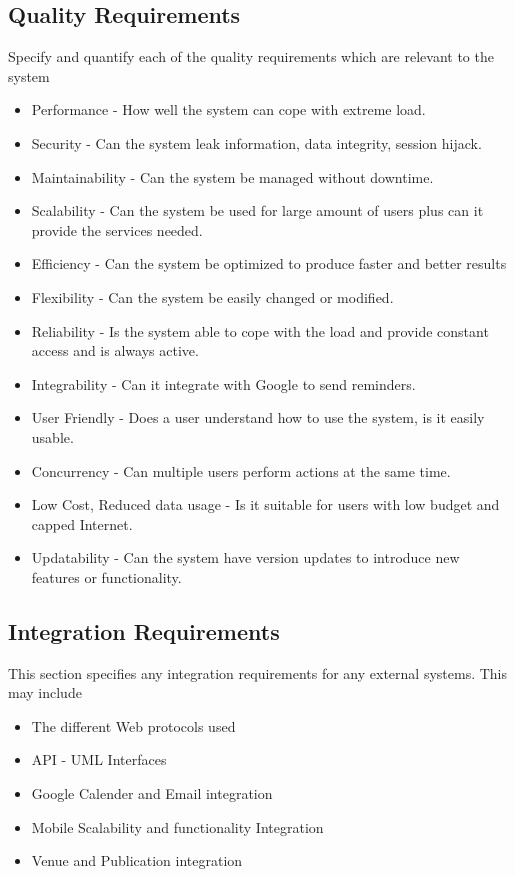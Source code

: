 \documentclass[a4paper]{article}
\begin{document}
	\subsection{Quality Requirements}
	Specify and quantify each of the quality requirements which are relevant to the system
	\begin{itemize}
		\item Performance - How well the system can cope with extreme load.
		\item Security - Can the system leak information, data integrity, session hijack.
		\item Maintainability - Can the system be managed without downtime.
		\item Scalability - Can the system be used for large amount of users plus can it provide the services needed.
		\item Efficiency - Can the system be optimized to produce faster and better results
		\item Flexibility - Can the system be easily changed or modified.
		\item Reliability - Is the system able to cope with the load and provide constant access and is always active.
		\item Integrability - Can it integrate with Google to send reminders.
		\item User Friendly - Does a user understand how to use the system, is it easily usable.
		\item Concurrency - Can multiple users perform actions at the same time.
		\item Low Cost, Reduced data usage - Is it suitable for users with low budget and capped Internet.
		\item Updatability - Can the system have version updates to introduce new features or functionality.
		\\
	\end{itemize}
	
	\subsection{Integration Requirements}
	This section specifies any integration requirements for any external systems. This may include
	\begin{itemize}
		\item The different Web protocols used 
		\item API - UML Interfaces
		\item Google Calender and Email integration
		\item Mobile Scalability and functionality Integration
		\item Venue and Publication integration
		\\
	\end{itemize}
	
\end{document}
